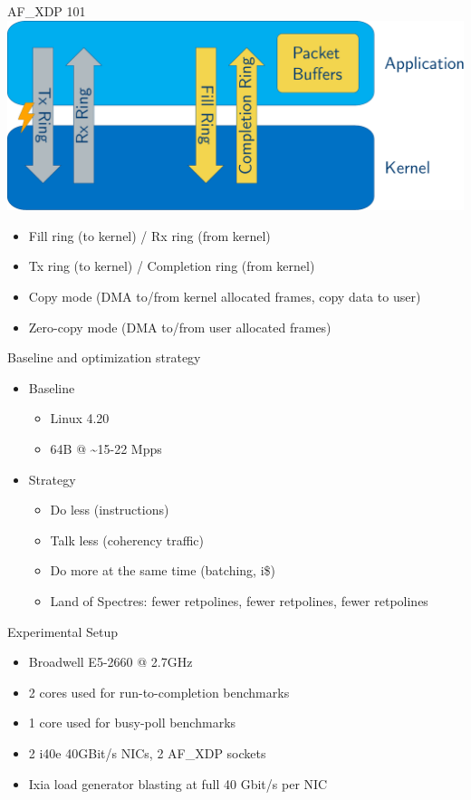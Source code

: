 \documentclass[aspectratio=169, xcolor=table]{beamer}
\begin{document}
  \begin{frame}{AF\_XDP 101}
    \centering\includegraphics[scale=.4]{basic-concepts-rings.pdf}
    \begin{itemize}
    \item Fill ring (to kernel) / Rx ring (from kernel)
    \item Tx ring (to kernel) / Completion ring (from kernel)
    \item Copy mode (DMA to/from kernel allocated frames, copy data to user)
    \item Zero-copy mode (DMA to/from user allocated frames)
    \end{itemize}
  \end{frame}

  \begin{frame}{Baseline and optimization strategy}
      \begin{itemize}
      \item Baseline
      \begin{itemize}
      \item Linux 4.20
      \item 64B @ \textasciitilde15-22 Mpps
      \end{itemize}

      \item Strategy
      \begin{itemize}
        \item Do less (instructions)
        \item Talk less (coherency traffic)
        \item Do more at the same time (batching, i\$)
        \item Land of Spectres: fewer retpolines, fewer retpolines,
          fewer retpolines
      \end{itemize}
      \end{itemize}
  \end{frame}

  \begin{frame}{Experimental Setup}
  \begin{itemize}
  \item Broadwell E5-2660 @ 2.7GHz
  \item 2 cores used for run-to-completion benchmarks
  \item 1 core used for busy-poll benchmarks
  \item 2 i40e 40GBit/s NICs, 2 AF\_XDP sockets
  \item Ixia load generator blasting at full 40 Gbit/s per NIC
  \end{itemize}
  \end{frame}
\end{document}
